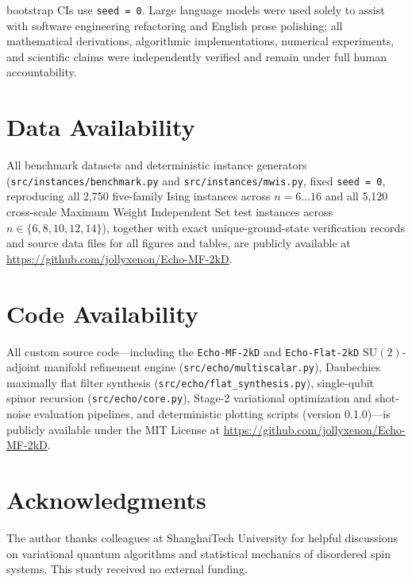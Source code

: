 \documentclass[10pt,a4paper]{article}
\begin{document}
bootstrap CIs use \texttt{seed = 0}. Large language models were used solely to assist with software engineering refactoring and English prose polishing; all mathematical derivations, algorithmic implementations, numerical experiments, and scientific claims were independently verified and remain under full human accountability.


\section*{Data Availability}

All benchmark datasets and deterministic instance generators (\texttt{src/\allowbreak{}instances/\allowbreak{}benchmark.py} and \texttt{src/\allowbreak{}instances/\allowbreak{}mwis.py}, fixed \texttt{seed = 0}, reproducing all 2,750 five-family Ising instances across $n = 6\ldots 16$ and all 5,120 cross-scale Maximum Weight Independent Set test instances across $n \in \{6, 8, 10, 12, 14\}$), together with exact unique-ground-state verification records and source data files for all figures and tables, are publicly available at \url{https://github.com/jollyxenon/Echo-MF-2kD}.

\section*{Code Availability}

All custom source code---including the \texttt{Echo-MF-2kD} and \texttt{Echo-Flat-2kD} $\mathrm{SU}(2)$-adjoint manifold refinement engine (\texttt{src/\allowbreak{}echo/\allowbreak{}multiscalar.py}), Daubechies maximally flat filter synthesis (\texttt{src/\allowbreak{}echo/\allowbreak{}flat\_\allowbreak{}synthesis.py}), single-qubit spinor recursion (\texttt{src/\allowbreak{}echo/\allowbreak{}core.py}), Stage-2 variational optimization and shot-noise evaluation pipelines, and deterministic plotting scripts (version 0.1.0)---is publicly available under the MIT License at \url{https://github.com/jollyxenon/Echo-MF-2kD}.




\section*{Acknowledgments}

The author thanks colleagues at ShanghaiTech University for helpful discussions on variational quantum algorithms and statistical mechanics of disordered spin systems. This study received no external funding.
\end{document}
